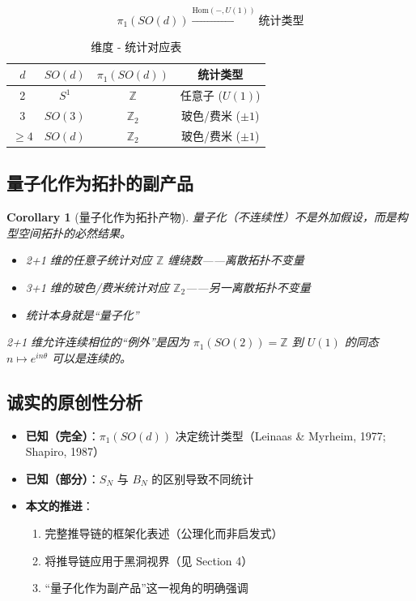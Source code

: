 \documentclass[11pt,a4paper]{article}
\newtheorem{corollary}{Corollary}[section]
\begin{document}
\begin{equation}
\pi_1(SO(d)) \xrightarrow{\text{Hom}(-,U(1))} \text{统计类型}
\end{equation}

\begin{table}[h]
\centering
\begin{tabular}{c c c c}
\hline
$d$ & $SO(d)$ & $\pi_1(SO(d))$ & 统计类型 \\ \hline
2 & $S^1$ & $\mathbb{Z}$ & 任意子 ($U(1)$) \\
3 & $SO(3)$ & $\mathbb{Z}_2$ & 玻色/费米 ($\pm 1$) \\
$\geq 4$ & $SO(d)$ & $\mathbb{Z}_2$ & 玻色/费米 ($\pm 1$) \\ \hline
\end{tabular}
\caption{维度 - 统计对应表}
\end{table}

\subsection{量子化作为拓扑的副产品}

\begin{corollary}[量子化作为拓扑产物]
量子化（不连续性）不是外加假设，而是构型空间拓扑的必然结果。

\begin{itemize}
\item 2+1 维的任意子统计对应 $\mathbb{Z}$ 缠绕数——离散拓扑不变量
\item 3+1 维的玻色/费米统计对应 $\mathbb{Z}_2$——另一离散拓扑不变量
\item 统计本身就是``量子化''
\end{itemize}

2+1 维允许连续相位的``例外''是因为 $\pi_1(SO(2)) = \mathbb{Z}$ 到
$U(1)$ 的同态 $n \mapsto e^{in\theta}$ 可以是连续的。
\end{corollary}

\subsection{诚实的原创性分析}

\begin{itemize}
\item \textbf{已知（完全）}：$\pi_1(SO(d))$ 决定统计类型（Leinaas \& Myrheim, 1977; Shapiro, 1987）
\item \textbf{已知（部分）}：$S_N$ 与 $B_N$ 的区别导致不同统计
\item \textbf{本文的推进}：
\begin{enumerate}
\item 完整推导链的框架化表述（公理化而非启发式）
\item 将推导链应用于黑洞视界（见 Section 4）
\item ``量子化作为副产品''这一视角的明确强调
\end{enumerate}
\end{itemize}
\end{document}

